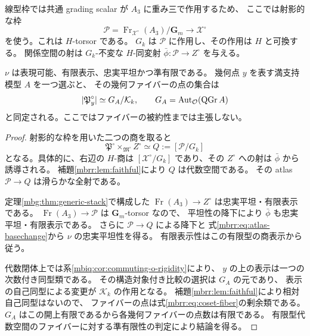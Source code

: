 線型枠では共通 grading scalar が $A_3$ に重み三で作用するため、
ここでは射影的な枠
\begin{equation}\label{mbrr:eq:projective-frames}
 \mathcal P
 =\operatorname{Fr}_{\mathcal X^\circ}(A_3)/\mathbf G_m
 \longrightarrow\mathcal X^\circ
\end{equation}
を使う。これは $H$-torsor である。
$G_k$ は $\mathcal P$ に作用し、その作用は $H$ と可換する。
関係空間の射は $G_k$-不変な $H$-同変射
$\bar\phi:\mathcal P\to Z^\circ$ を与える。

\begin{proposition}[忘却射の平坦性と準有限性]
\label{mbrr:prop:forgetful}
$\nu$ は表現可能、有限表示、忠実平坦かつ準有限である。
幾何点 $y$ を表す満支持模型 $A$ を一つ選ぶと、
その幾何ファイバーの点の集合は
\begin{equation}\label{mbrr:eq:coset-fiber}
 |\mathfrak P^\circ_y|
 \simeq G_A/\mathcal K_k,\qquad
 G_A=\operatorname{Aut}_{\mathcal O}(\operatorname{QGr} A)
\end{equation}
と同定される。ここではファイバーの被約性までは主張しない。
\end{proposition}
\begin{proof}
射影的な枠を用いた二つの商を取ると
\begin{equation}\label{mbrr:eq:atlas-basechange}
 \mathfrak P^\circ\times_{\mathfrak M^\circ} Z^\circ
 \simeq Q:=[\mathcal P/G_k]
\end{equation}
となる。具体的に、右辺の $H$-商は
$[\mathcal X^\circ/G_k]$ であり、その $Z^\circ$ への射は
$\bar\phi$ から誘導される。
補題\ref{mbrr:lem:faithful}により $Q$ は代数空間である。
その atlas $\mathcal P\to Q$ は滑らかな全射である。

定理\ref{mbg:thm:generic-stack}で構成した
$\operatorname{Fr}(A_3)\to Z^\circ$ は忠実平坦・有限表示である。
$\operatorname{Fr}(A_3)\to\mathcal P$ は $\mathbf G_m$-torsor なので、
平坦性の降下により $\bar\phi$ も忠実平坦・有限表示である。
さらに $\mathcal P\to Q$ による降下と
式\eqref{mbrr:eq:atlas-basechange}から $\nu$ の忠実平坦性を得る。
有限表示性はこの有限型の商表示から従う。

代数閉体上では系\ref{mbiq:cor:commuting-o-rigidity}により、
$y$ の上の表示は一つの次数付き同型類である。
その構造対象付き比較の選択は $G_A$ の元であり、
表示の自己同型による変更が $\mathcal K_k$ の作用となる。
補題\ref{mbrr:lem:faithful}により相対自己同型はないので、
ファイバーの点は式\eqref{mbrr:eq:coset-fiber}の剰余類である。
$G_A$ はこの開上有限であるから各幾何ファイバーの点数は有限である。
有限型代数空間のファイバーに対する準有限性の判定により結論を得る。
\end{proof}

